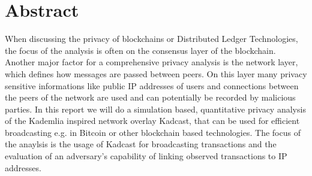 \section{Abstract}
When discussing the privacy of blockchains or Distributed Ledger Technologies, the
focus of the analysis is often on the consensus layer of the blockchain.
Another major factor for a comprehensive privacy analysis is
the network layer, which defines how messages are passed between peers.
On this layer many privacy sensitive informations like public IP addresses of users and connections between the peers
of the network are used and can potentially be recorded by malicious parties.
In this report we will do a simulation based, quantitative privacy analysis of the Kademlia inspired
network overlay Kadcast, that can be used for efficient broadcasting e.g. in Bitcoin or other blockchain based technologies.
The focus of the anaylsis is the usage of Kadcast for broadcasting transactions and the evaluation of an adversary's capability
of linking observed transactions to IP addresses.